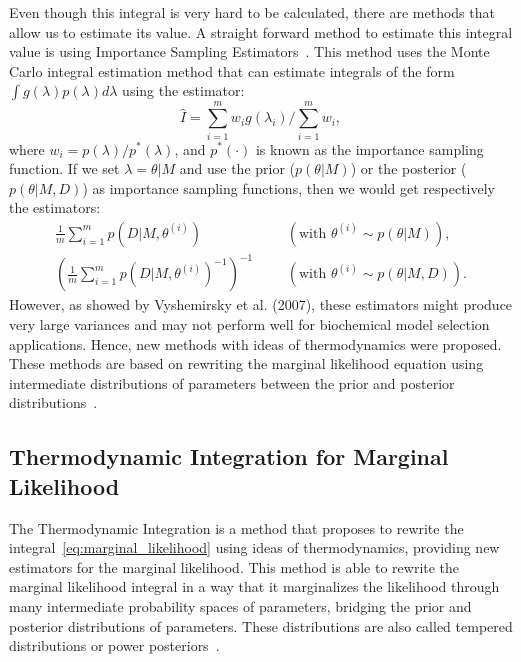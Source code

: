 Even though this integral is very hard to be calculated, there are 
methods that allow us to estimate its value. A straight forward method 
to estimate this integral value is using Importance Sampling 
Estimators~\cite{Newton1993}. This method uses the Monte Carlo integral 
estimation method that can estimate integrals of the form 
$\int g(\lambda) p(\lambda)d\lambda$ using the estimator:
\begin{equation*}
    \hat{I} = \sum_{i = 1}^m w_i g(\lambda_i) / \sum_{i = 1}^m w_i,
\label{eq:importance_sampling_estimator}
\end{equation*}
where $w_i = p (\lambda) / p^* (\lambda)$, and $p^*(\cdot)$ is known as 
the importance sampling function. If we set $\lambda = \theta | M$ and
use the prior ($p(\theta | M)$) or the posterior ($p(\theta | M, D)$) as 
importance sampling functions, then we would get respectively the 
estimators:
\begin{equation*}
\begin{aligned}
    \frac{1}{m} \sum_{i = 1}^m p(D|M, \theta^{(i)}) &&& 
        (\text{with } \theta^{(i)} \sim p(\theta|M)), \\
    \left(\frac{1}{m} \sum_{i = 1}^m p(D|M, \theta^{(i)})^{-1} \right)^{-1} &&&
        (\text{with } \theta^{(i)} \sim p(\theta|M, D)).
\end{aligned}
\end{equation*}
However, as showed by Vyshemirsky et al. (2007), these estimators might
produce very large variances and may not perform well for biochemical
model selection applications. Hence, new methods with ideas of 
thermodynamics were proposed. These methods are based on rewriting the
marginal likelihood equation using intermediate distributions of 
parameters between the prior and posterior 
distributions~\cite{Friel2008}.

\subsection{Thermodynamic Integration for Marginal Likelihood}
The Thermodynamic Integration is a method that proposes to rewrite
the integral~\ref{eq:marginal_likelihood} using ideas of thermodynamics,
providing new estimators for the marginal likelihood. This method is
able to rewrite the marginal likelihood integral in a way that it 
marginalizes the likelihood through many intermediate probability spaces 
of parameters, bridging the prior and posterior distributions of 
parameters. These distributions are also called tempered distributions
or power posteriors~\cite{Friel2008}.

